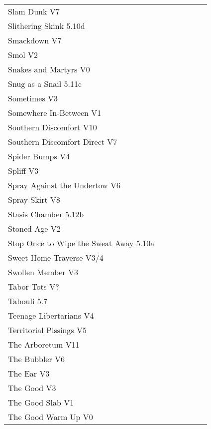 \begin{flushleft}
\begin{center}
\begin{supertabular}{p{0.76\linewidth}p{0.08\linewidth}}
Slam Dunk V7 & \pageref{rt:Slam Dunk} \\
Slithering Skink 5.10d & \pageref{rt:Slithering Skink} \\
Smackdown V7 & \pageref{rt:Smackdown} \\
Smol V2 & \pageref{rt:Smol} \\
Snakes and Martyrs V0 & \pageref{rt:Snakes and Martyrs} \\
Snug as a Snail 5.11c & \pageref{rt:Snug as a Snail} \\
Sometimes V3 & \pageref{rt:Sometimes} \\
Somewhere In-Between V1 & \pageref{rt:Somewhere In-Between} \\
Southern Discomfort V10 & \pageref{rt:Southern Discomfort} \\
Southern Discomfort Direct V7 & \pageref{vr:Southern Discomfort Direct} \\
Spider Bumps V4 & \pageref{rt:Spider Bumps} \\
Spliff V3 & \pageref{rt:Spliff} \\
Spray Against the Undertow V6 & \pageref{vr:Spray Against the Undertow} \\
Spray Skirt V8 & \pageref{rt:Spray Skirt} \\
Stasis Chamber 5.12b & \pageref{rt:Stasis Chamber} \\
Stoned Age V2 & \pageref{rt:Stoned Age} \\
Stop Once to Wipe the Sweat Away 5.10a & \pageref{rt:Stop Once to Wipe the Sweat Away} \\
Sweet Home Traverse V3/4 & \pageref{vr:Sweet Home Traverse} \\
Swollen Member V3 & \pageref{rt:Swollen Member} \\
Tabor Tots V? & \pageref{vr:Tabor Tots} \\
Tabouli 5.7 & \pageref{rt:Tabouli} \\
Teenage Libertarians V4 & \pageref{rt:Teenage Libertarians} \\
Territorial Pissings V5 & \pageref{rt:Territorial Pissings} \\
The Arboretum V11 & \pageref{rt:The Arboretum} \\
The Bubbler V6 & \pageref{rt:The Bubbler} \\
The Ear V3 & \pageref{rt:The Ear} \\
The Good V3 & \pageref{rt:The Good} \\
The Good Slab V1 & \pageref{rt:The Good Slab} \\
The Good Warm Up V0 & \pageref{rt:The Good Warm Up} \\

\end{supertabular}
\end{center}
\end{flushleft}
